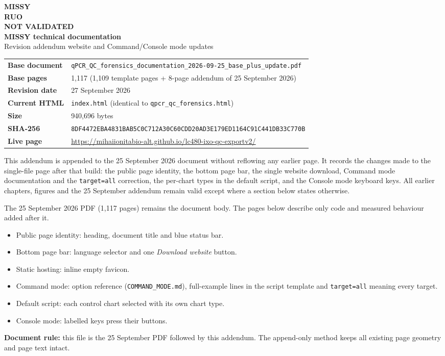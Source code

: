 \documentclass[11pt,a4paper]{article}
\newcommand{\sect}[1]{\par\medskip{\large\bfseries\color{ink}#1}\par\smallskip}
\newcommand{\sha}{8DF4472EBA4831BAB5C0C712A30C60CDD20AD3E179ED1164C91C441DB33C770B}
\begin{document}
\thispagestyle{fancy}
\vspace*{1.5cm}
\begin{center}
{\fontsize{34}{38}\selectfont\bfseries\color{ink}MISSY}\\[4pt]
{\Large\bfseries\color{teal}RUO}\\[2pt]
{\large\bfseries\color{amber!80!black}NOT VALIDATED}\\[1.2cm]
{\LARGE\bfseries MISSY technical documentation}\\[6pt]
{\large Revision addendum \textperiodcentered{} website and Command/Console mode updates}\\[1.2cm]
\begin{tabular}{>{\bfseries}l l}
Base document & \texttt{qPCR\_QC\_forensics\_documentation\_2026-09-25\_base\_plus\_update.pdf}\\
Base pages & 1,117 (1,109 template pages + 8-page addendum of 25 September 2026)\\
Revision date & 27 September 2026\\
Current HTML & \texttt{index.html} (identical to \texttt{qpcr\_qc\_forensics.html})\\
Size & 940,696 bytes\\
SHA-256 & \texttt{\footnotesize\sha}\\
Live page & \url{https://mihaiionitabio-alt.github.io/lc480-ixo-qc-exportv2/}\\
\end{tabular}
\end{center}
\vspace{1cm}
This addendum is appended to the 25 September 2026 document without reflowing any earlier page. It records the
changes made to the single-file page after that build: the public page identity, the bottom page bar, the single
website download, Command mode documentation and the \texttt{target=all} correction, the per-chart types in the
default script, and the Console mode keyboard keys. All earlier chapters, figures and the 25 September addendum
remain valid except where a section below states otherwise.

\newpage
\sect{1. Scope of the update}
The 25 September 2026 PDF (1,117 pages) remains the document body. The pages below describe only code and measured
behaviour added after it.
\begin{itemize}
\item Public page identity: heading, document title and blue status bar.
\item Bottom page bar: language selector and one \emph{Download website} button.
\item Static hosting: inline empty favicon.
\item Command mode: option reference (\texttt{COMMAND\_MODE.md}), full-example lines in the script template and
      \texttt{target=all} meaning every target.
\item Default script: each control chart selected with its own chart type.
\item Console mode: labelled keys press their buttons.
\end{itemize}
\textbf{Document rule:} this file is the 25 September PDF followed by this addendum. The append-only method keeps all
existing page geometry and page text intact.
\end{document}
